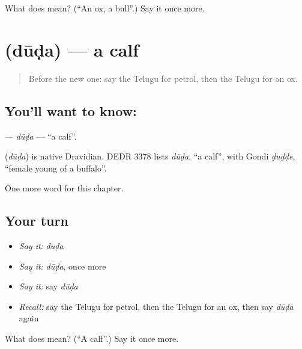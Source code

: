 \begin{tcolorbox}[breakable,colback=teal!4,colframe=teal!35!black,title={Before you move on}]
What does  mean? (\textquotedblleft{}An ox, a bull\textquotedblright{}.) Say it once more.
\end{tcolorbox}
\section[\texorpdfstring{\te{దూడ} (dūḍa)}{దూడ (dūḍa)}]{ (dūḍa) — a calf}

\label{lesson:TE-C302-duda}



\begin{quote}
Before the new one: say the Telugu for petrol, then the Telugu for an ox.
\end{quote}

\subsection*{You'll want to know: }
\textbf{} — \emph{dūḍa} — \textquotedblleft{}a calf\textquotedblright{}.

\begin{cousinweb}
\textbf{} (\emph{dūḍa}) is native Dravidian. DEDR 3378 lists \emph{dūḍa}, \textquotedblleft{}a calf\textquotedblright{}, with Gondi \emph{ḍuḍḍe}, \textquotedblleft{}female young of a buffalo\textquotedblright{}.
\end{cousinweb}

\begin{grammarlens}[title={What you've built}]
One more word for this chapter.
\end{grammarlens}

\subsection*{Your turn}
\begin{itemize}
\raggedright
  \item \emph{Say it:} \emph{dūḍa}
  \item \emph{Say it:} \emph{dūḍa}, once more
  \item \emph{Say it:} say \emph{dūḍa}
  \item \emph{Recall:} say the Telugu for petrol, then the Telugu for an ox, then say \emph{dūḍa} again
\end{itemize}

\begin{tcolorbox}[breakable,colback=teal!4,colframe=teal!35!black,title={Before you move on}]
What does  mean? (\textquotedblleft{}A calf\textquotedblright{}.) Say it once more.
\end{tcolorbox}
